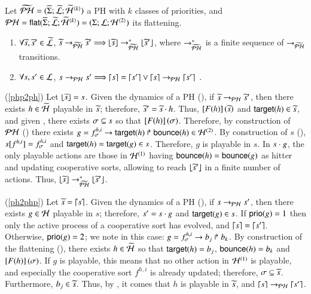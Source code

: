 \begin{theorem}
\label{th:bisimPHP}
  Let $\ov{\PH} = (\ov{\PHs}; \ov{\PHl}; \ov{\PHa}^{\angles{k}})$ a PH with $k$ classes of priorities,
  and $\PH = \PHflat(\ov{\PHs}; \ov{\PHl}; \ov{\PHa}^{\angles{k}}) = (\PHs; \PHl; \PHa^{\angles{2}})$ its flattening.
  \begin{enumerate}
    \item \label{php2ph} $\forall \os, \os' \in \ov{\PHl}$,
      $\os \PHPtrans[\oPH] \os' \Longrightarrow \flats{\os} \PHPtrans[\oPH]^* \flats{\os'}$,
      where $\PHPtrans[\oPH]^*$ is a finite sequence of $\PHPtrans[\oPH]$ transitions.
    \item \label{ph2php} $\forall s, s' \in \PHl$,
      $s \PHPtrans s' \Longrightarrow \unflats{s} = \unflats{s'} \vee
      \unflats{s} \PHPtrans \unflats{s'} \enspace.$
  \end{enumerate}
\end{theorem}
%
\begin{proofbisimPHP}
  (\ref{php2ph}) Let $\flats{\os} = s$.
    Given the dynamics of a PH (), if $\os \PHPtrans[\PH] \os'$,
    then there exists $h \in \ov{\PHh}$ playable in $\os$;
    therefore, $\os' = \os \PHplay h$.
    Thus, $\Fsem{\Fop{h}}{\os}$ and $\target{h} \in \os$,
    and given , there exists $\mysigma \subseteq s$ so that $\Fsem{\Fop{h}}{\mysigma}$.
    Therefore, by construction of $\PH$ () there exists
    $g = \PHhit{f^{h,i}_\mysigma}{\target{h}}{\bounce{h}} \in \PHh^{(2)}$.
    By construction of $s$ (), $\PHget{s}{f^{h,i}} = f^{h,i}_\mysigma$ and $\target{h} = \target{g} \in s$.
    Therefore, $g$ is playable in $s$.
    In $s \PHplay g$, the only playable actions are those in $\PHh^{(1)}$ having $\bounce{h} = \bounce{g}$ as hitter
    and updating cooperative sorts, allowing to reach $\flats{\os'}$ in a finite number of actions.
    Thus, $\flats{\os} \PHPtrans[\oPH]^* \flats{\os'}$.
  
  (\ref{ph2php}) Let $\os = \unflats{s}$.
    Given the dynamics of a PH (), if $s \PHPtrans s'$,
    then there exists $g \in \PHh$ playable in $s$; therefore, $s' = s \PHplay g$ and $\target{g} \in s$.
    If $\prio(g) = 1$ then only the active process of a cooperative sort has evolved, and $\unflats{s} = \unflats{s'}$.
    Otherwise, $\prio(g) = 2$; we note in this case: $g = \PHhit{f^{h,i}_\mysigma}{b_j}{b_k}$.
    By construction of the flattening (), there exists $h \in \ov{\PHh}$ so that
    $\target{h} = b_j$, $\bounce{h} = b_k$ and $\Fsem{\Fop{h}}{\mysigma}$.
    If $g$ is playable, this means that no other action in $\PHh^{(1)}$ is playable, and especially the cooperative sort
    $f^{h,i}$ is already updated; therefore, $\mysigma \subseteq \os$.
    Furthermore, $b_j \in \os$.
    Thus, by , it comes that $h$ is playable in $\os$,
    and $\unflats{s} \PHPtrans \unflats{s'}$.
\end{proofbisimPHP}

